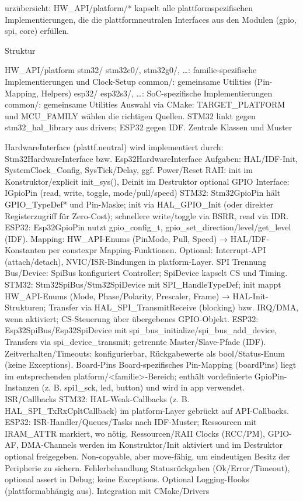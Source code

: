 \vspace{5mm}


urzübersicht: HW\_API/platform/* kapselt alle plattformspezifischen Implementierungen, die die plattformneutralen Interfaces aus den Modulen (gpio, spi, core) erfüllen.

Struktur

HW\_API/platform
stm32/
stm32c0/, stm32g0/, …: familie-spezifische Implementierungen und Clock-Setup
common/: gemeinsame Utilities (Pin-Mapping, Helpers)
esp32/
esp32s3/, …: SoC-spezifische Implementierungen
common/: gemeinsame Utilities
Auswahl via CMake:
TARGET\_PLATFORM und MCU\_FAMILY wählen die richtigen Quellen.
STM32 linkt gegen stm32\_hal\_library aus drivers; ESP32 gegen IDF.
Zentrale Klassen und Muster

HardwareInterface (plattf.neutral) wird implementiert durch:
Stm32HardwareInterface bzw. Esp32HardwareInterface
Aufgaben: HAL/IDF-Init, SystemClock\_Config, SysTick/Delay, ggf. Power/Reset
RAII: init im Konstruktor/explicit init\_sys(), Deinit im Destruktor optional
GPIO
Interface: IGpioPin (read, write, toggle, mode/pull/speed)
STM32: Stm32GpioPin hält GPIO\_TypeDef* und Pin-Maske; init via HAL\_GPIO\_Init (oder direkter Registerzugriff für Zero-Cost); schnellere write/toggle via BSRR, read via IDR.
ESP32: Esp32GpioPin nutzt gpio\_config\_t, gpio\_set\_direction/level/get\_level (IDF).
Mapping: HW\_API-Enums (PinMode, Pull, Speed) → HAL/IDF-Konstanten per constexpr Mapping-Funktionen.
Optional: Interrupt-API (attach/detach), NVIC/ISR-Bindungen in platform-Layer.
SPI
Trennung Bus/Device: SpiBus konfiguriert Controller; SpiDevice kapselt CS und Timing.
STM32: Stm32SpiBus/Stm32SpiDevice mit SPI\_HandleTypeDef; init mappt HW\_API-Enums (Mode, Phase/Polarity, Prescaler, Frame) → HAL-Init-Strukturen; Transfer via HAL\_SPI\_TransmitReceive (blocking) bzw. IRQ/DMA, wenn aktiviert; CS-Steuerung über übergebenes GPIO-Objekt.
ESP32: Esp32SpiBus/Esp32SpiDevice mit spi\_bus\_initialize/spi\_bus\_add\_device, Transfers via spi\_device\_transmit; getrennte Master/Slave-Pfade (IDF).
Zeitverhalten/Timeouts: konfigurierbar, Rückgabewerte als bool/Status-Enum (keine Exceptions).
Board-Pins
Board-spezifisches Pin-Mapping (boardPins) liegt im entsprechenden platform/<familie>-Bereich; enthält vordefinierte GpioPin-Instanzen (z. B. spi1\_sck, led, button) und wird in app verwendet.
ISR/Callbacks
STM32: HAL-Weak-Callbacks (z. B. HAL\_SPI\_TxRxCpltCallback) im platform-Layer gebrückt auf API-Callbacks.
ESP32: ISR-Handler/Queues/Tasks nach IDF-Muster; Ressourcen mit IRAM\_ATTR markiert, wo nötig.
Ressourcen/RAII
Clocks (RCC/PM), GPIO-AF, DMA-Channels werden im Konstruktor/Init aktiviert und im Destruktor optional freigegeben.
Non-copyable, aber move-fähig, um eindeutigen Besitz der Peripherie zu sichern.
Fehlerbehandlung
Statusrückgaben (Ok/Error/Timeout), optional assert in Debug; keine Exceptions.
Optional Logging-Hooks (plattformabhängig aus).
Integration mit CMake/Drivers

